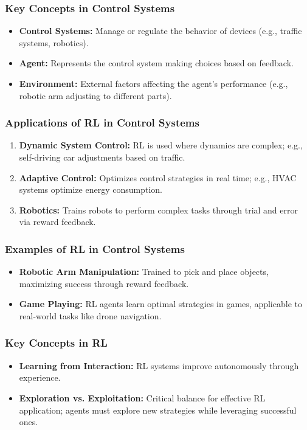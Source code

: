 \documentclass[aspectratio=169]{beamer}
\begin{document}
\begin{frame}[fragile]
    \frametitle{Key Concepts in Control Systems}
    \begin{itemize}
        \item \textbf{Control Systems:} Manage or regulate the behavior of devices (e.g., traffic systems, robotics).
        \item \textbf{Agent:} Represents the control system making choices based on feedback.
        \item \textbf{Environment:} External factors affecting the agent's performance (e.g., robotic arm adjusting to different parts).
    \end{itemize}
\end{frame}

\begin{frame}[fragile]
    \frametitle{Applications of RL in Control Systems}
    \begin{enumerate}
        \item \textbf{Dynamic System Control:} RL is used where dynamics are complex; e.g., self-driving car adjustments based on traffic.
        \item \textbf{Adaptive Control:} Optimizes control strategies in real time; e.g., HVAC systems optimize energy consumption.
        \item \textbf{Robotics:} Trains robots to perform complex tasks through trial and error via reward feedback.
    \end{enumerate}
\end{frame}

\begin{frame}[fragile]
    \frametitle{Examples of RL in Control Systems}
    \begin{itemize}
        \item \textbf{Robotic Arm Manipulation:} Trained to pick and place objects, maximizing success through reward feedback.
        \item \textbf{Game Playing:} RL agents learn optimal strategies in games, applicable to real-world tasks like drone navigation.
    \end{itemize}
\end{frame}

\begin{frame}[fragile]
    \frametitle{Key Concepts in RL}
    \begin{itemize}
        \item \textbf{Learning from Interaction:} RL systems improve autonomously through experience.
        \item \textbf{Exploration vs. Exploitation:} Critical balance for effective RL application; agents must explore new strategies while leveraging successful ones.
    \end{itemize}
\end{frame}
\end{document}
